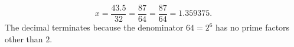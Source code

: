 \[x=\dfrac{43.5}{32}=\dfrac{87}{64}=\boxed{\dfrac{87}{64}=1.359375}.\]
The decimal terminates because the denominator $64=2^6$ has no prime factors other than $2$.
